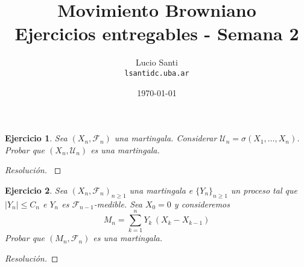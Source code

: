 \documentclass[a4paper,11pt]{article}
\title{Movimiento Browniano\\
      \small{Ejercicios entregables - Semana 2}}
\author{Lucio Santi\\
        \texttt{lsanti\at dc.uba.ar}}
\date{\today}
\newcommand{\abs}[1]{\ensuremath{\left\lvert #1 \right\rvert}}
\newcommand{\Sig}[1]{\ensuremath{\mathcal{#1}}}
\newcommand{\SigAlg}[1]{\ensuremath{\sigma\left(#1\right)}}
\newtheorem*{ej}{Ejercicio}
\begin{document}
\maketitle

\begin{ej} 
    Sea $(X_n, \Sig{F}_n)$ una martingala. Considerar $\Sig{U}_n = \SigAlg{X_1, \dots, X_n}$.
    Probar que $(X_n, \Sig{U}_n)$ es una martingala.
\end{ej}

\begin{proof}[Resoluci\'on]
$ $

\end{proof}


\begin{ej}
    Sea $(X_n, \Sig{F}_n)_{n \geq 1}$ una martingala e $\{Y_n\}_{n \geq 1}$ un proceso tal
    que $\abs{Y_n} \leq C_n$ e $Y_n$ es $\Sig{F}_{n−1}$-medible. Sea $X_0 = 0$ y consideremos
    $$M_n = \displaystyle \sum_{k = 1}^{n}{Y_k \, (X_k − X_{k−1})}$$
    Probar que $(M_n, \Sig{F}_n)$ es una martingala. 
\end{ej}

\begin{proof}[Resoluci\'on]

\end{proof}
\end{document}
